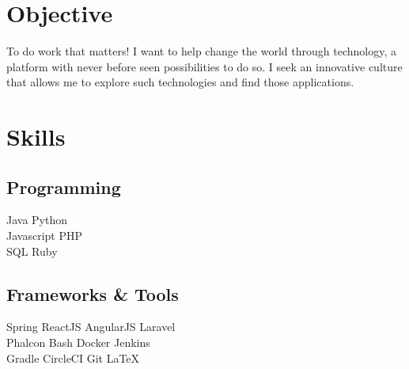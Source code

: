 \documentclass[]{resume}
\begin{document}
%
%


%
%


%
%

\begin{minipage}[t]{0.33\textwidth}


\section{Objective}
\begin{minipage}[t]{0.90\textwidth}
To do work that matters! I want to help change the world through technology, a platform with never before seen possibilities to do so. I seek an innovative culture that allows me to explore such technologies and find those applications.
\end{minipage}
\sectionsep


\section{Skills}
\subsection{Programming}
Java \textbullet{} Python \\
Javascript \textbullet{} PHP \\
SQL \textbullet{} Ruby \\
\sectionsep

\subsection{Frameworks \& Tools}
Spring \textbullet{}  ReactJS  \textbullet{}  AngularJS \textbullet{}  Laravel \\
Phalcon \textbullet{} Bash \textbullet{} Docker \textbullet{} Jenkins \\ 
Gradle \textbullet{} CircleCI \textbullet{} Git \textbullet{}  LaTeX
\sectionsep


\end{minipage}
\end{document}
